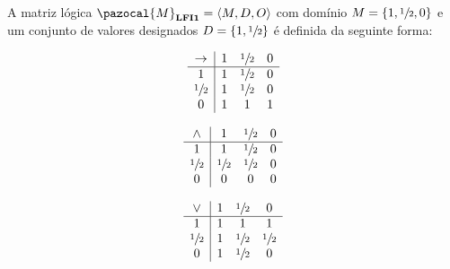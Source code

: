         \begin{definicao}
            A matriz lógica $\pazocal{M}_{\lfium{}} = \langle M, D, O \rangle$ com domínio $M = \{1, \sfrac{1}{2}{}, 0\}$ e um conjunto de valores designados $D = \{1, \sfrac{1}{2}{}\}$ é definida da seguinte forma:
            

            \vspace{\baselineskip} %

            \noindent
            \begin{minipage}{0.3\textwidth}
                \[
                    \begin{array}{c|ccc} %
                        \to & 1 & \meio{} & 0 \\
                        \hline%
                        1           & 1 & \meio{} & 0 \\
                        \meio{} & 1 & \meio{} & 0 \\
                        0           & 1 & 1           & 1 \\
                    \end{array}
                \]
            \end{minipage}
            \begin{minipage}{0.3\textwidth}
                \[
                    \begin{array}{c|ccc} %
                        \land       & 1           & \meio{} & 0 \\
                        \hline%
                        1           & 1           & \meio{} & 0 \\
                        \meio{} & \meio{} & \meio{} & 0 \\
                        0           & 0           & 0           & 0 \\
                    \end{array}
                \]
            \end{minipage}
            \begin{minipage}{0.3\textwidth}
                \[
                    \begin{array}{c|ccc} %
                        \lor        & 1 & \meio{} & 0           \\
                        \hline%
                        1           & 1 & 1           & 1           \\
                        \meio{} & 1 & \meio{} & \meio{} \\
                        0           & 1 & \meio{} & 0           \\
                    \end{array}
                \]
            \end{minipage}


\end{definicao}
